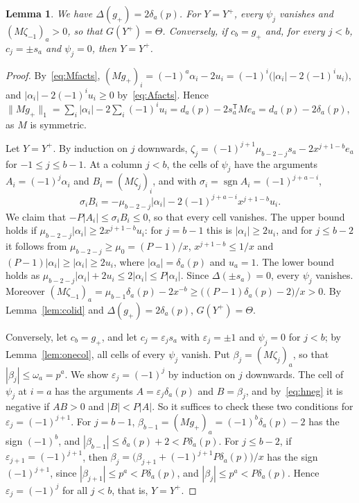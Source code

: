 \documentclass[11pt]{article}
\newtheorem{lemma}[theorem]{Lemma}
\theoremstyle{remark}
\begin{document}
\begin{lemma}\label{lem:eqgen}
We have $\Delta(g_+)=2\delta_a(p)$. For $Y=Y^+$, every $\psi_j$ vanishes and
$(M\zeta_{-1})_a>0$, so that $G(Y^+)=\Theta$. Conversely, if $c_b=g_+$ and,
for every $j<b$, $c_j=\pm s_a$ and $\psi_j=0$, then $Y=Y^+$.
\end{lemma}
\begin{proof}
By~\eqref{eq:Mfacts},
$(Mg_+)_i=(-1)^a\alpha_i-2u_i=(-1)^i\bigl(|\alpha_i|-2(-1)^iu_i\bigr)$, and
$|\alpha_i|-2(-1)^iu_i\ge0$ by~\eqref{eq:Afacts}. Hence
$\|Mg_+\|_1=\sum_i|\alpha_i|-2\sum_i(-1)^iu_i=d_a(p)-2s_a^{\mathsf T}Me_a
=d_a(p)-2\delta_a(p)$, as $M$ is symmetric.

Let $Y=Y^+$. By induction on $j$ downwards,
$\zeta_j=(-1)^{j+1}\mu_{b-2-j}s_a-2x^{j+1-b}e_a$ for $-1\le j\le b-1$. At a
column $j<b$, the cells of $\psi_j$ have the arguments $A_i=(-1)^j\alpha_i$
and $B_i=(M\zeta_j)_i$, and with $\sigma_i=\operatorname{sgn}A_i=(-1)^{j+a-i}$,
\[
\sigma_iB_i=-\mu_{b-2-j}|\alpha_i|-2(-1)^{j+a-i}x^{j+1-b}u_i.
\]
We claim that $-P|A_i|\le\sigma_iB_i\le0$, so that every cell vanishes. The
upper bound holds if $\mu_{b-2-j}|\alpha_i|\ge2x^{j+1-b}u_i$: for $j=b-1$ this
is $|\alpha_i|\ge2u_i$, and for $j\le b-2$ it follows from
$\mu_{b-2-j}\ge\mu_0=(P-1)/x$, $x^{j+1-b}\le1/x$ and
$(P-1)|\alpha_i|\ge|\alpha_i|\ge2u_i$, where $|\alpha_a|=\delta_a(p)$ and
$u_a=1$. The lower bound holds as
$\mu_{b-2-j}|\alpha_i|+2u_i\le2|\alpha_i|\le P|\alpha_i|$. Since
$\Delta(\pm s_a)=0$, every $\psi_j$ vanishes. Moreover
$(M\zeta_{-1})_a=\mu_{b-1}\delta_a(p)-2x^{-b}\ge\bigl((P-1)\delta_a(p)-2\bigr)/x>0$.
By Lemma~\ref{lem:colid} and $\Delta(g_+)=2\delta_a(p)$, $G(Y^+)=\Theta$.

Conversely, let $c_b=g_+$, and let $c_j=\varepsilon_js_a$ with
$\varepsilon_j=\pm1$ and $\psi_j=0$ for $j<b$; by Lemma~\ref{lem:onecol}, all
cells of every $\psi_j$ vanish. Put $\beta_j=(M\zeta_j)_a$, so that
$|\beta_j|\le\omega_a=p^a$. We show $\varepsilon_j=(-1)^j$ by induction on $j$
downwards. The cell of $\psi_j$ at $i=a$ has the arguments
$A=\varepsilon_j\delta_a(p)$ and $B=\beta_j$, and by~\eqref{eq:hneg} it is
negative if $AB>0$ and $|B|<P|A|$. So it suffices to check these two
conditions for $\varepsilon_j=(-1)^{j+1}$. For $j=b-1$,
$\beta_{b-1}=(Mg_+)_a=(-1)^b\delta_a(p)-2$ has the sign $(-1)^b$, and
$|\beta_{b-1}|\le\delta_a(p)+2<P\delta_a(p)$. For $j\le b-2$, if
$\varepsilon_{j+1}=(-1)^{j+1}$, then
$\beta_j=\bigl(\beta_{j+1}+(-1)^{j+1}P\delta_a(p)\bigr)/x$ has the sign
$(-1)^{j+1}$, since $|\beta_{j+1}|\le p^a<P\delta_a(p)$, and
$|\beta_j|\le p^a<P\delta_a(p)$. Hence $\varepsilon_j=(-1)^j$ for all $j<b$,
that is, $Y=Y^+$.
\end{proof}
\end{document}

